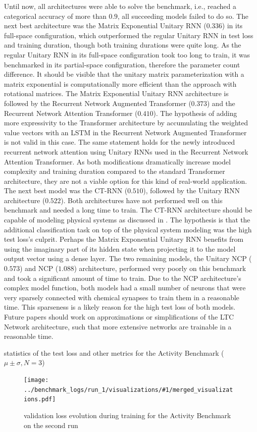 \documentclass[draft,final]{vutinfth} %
\newcommand{\benchmarksummary}[2]{
    \begin{table}
        \centering{}
        \resizebox{\linewidth}{!}{\csvautotabular[options]{../benchmark_logs/statistics/#1.csv}}
        \caption{statistics of the test loss and other metrics for the #2 Benchmark ($\mu \pm \sigma, N=3$)}
        \label{tab:test_loss_#1}
    \end{table}
    \begin{figure}[h]
        \centering{}
        \texttt{[image: ../benchmark\_logs/run\_1/visualizations/\#1/merged\_visualizations.pdf]}
        \caption{validation loss evolution during training for the #2 Benchmark on the second run}
        \label{fig:validation_loss_#1}
    \end{figure}
    \clearpage{}
}
\begin{document}
    Until now, all architectures were able to solve the benchmark, i.e., reached a categorical accuracy of more than $0.9$, all succeeding models failed to do so.
    The next best architecture was the Matrix Exponential Unitary RNN ($0.336$) in its full-space configuration, which outperformed the regular Unitary RNN in test loss and training duration, though both training durations were quite long.
    As the regular Unitary RNN in its full-space configuration took too long to train, it was benchmarked in its partial-space configuration, therefore the parameter count difference.
    It should be visible that the unitary matrix parameterization with a matrix exponential is computationally more efficient than the approach with rotational matrices.
    The Matrix Exponential Unitary RNN architecture is followed by the Recurrent Network Augmented Transformer ($0.373$) and the Recurrent Network Attention Transformer ($0.410$).
    The hypothesis of adding more expressivity to the Transformer architecture by accumulating the weighted value vectors with an LSTM in the Recurrent Network Augmented Transformer is not valid in this case.
    The same statement holds for the newly introduced recurrent network attention using Unitary RNNs used in the Recurrent Network Attention Transformer.
    As both modifications dramatically increase model complexity and training duration compared to the standard Transformer architecture, they are not a viable option for this kind of real-world application.
    The next best model was the CT-RNN ($0.510$), followed by the Unitary RNN architecture ($0.522$).
    Both architectures have not performed well on this benchmark and needed a long time to train.
    The CT-RNN architecture should be capable of modeling physical systems as discussed in .
    The hypothesis is that the additional classification task on top of the physical system modeling was the high test loss's culprit.
    Perhaps the Matrix Exponential Unitary RNN benefits from using the imaginary part of its hidden state when projecting it to the model output vector using a dense layer.
    The two remaining models, the Unitary NCP ($0.573$) and NCP ($1.088$) architecture, performed very poorly on this benchmark and took a significant amount of time to train.
    Due to the NCP architecture's complex model function, both models had a small number of neurons that were very sparsely connected with chemical synapses to train them in a reasonable time.
    This sparseness is a likely reason for the high test loss of both models.
    Future papers should work on approximations or simplifications of the LTC Network architecture, such that more extensive networks are trainable in a reasonable time.
    \benchmarksummary{activity}{Activity}
\end{document}
